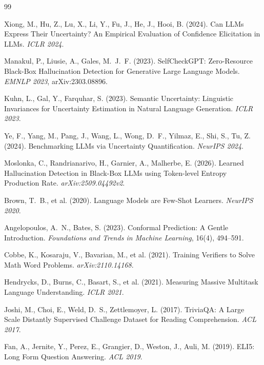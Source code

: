 \documentclass[12pt,a4paper]{article}
\begin{document}
\begin{thebibliography}{99}

Xiong, M., Hu, Z., Lu, X., Li, Y., Fu, J., He, J., Hooi, B. (2024).
Can LLMs Express Their Uncertainty? An Empirical Evaluation of
Confidence Elicitation in LLMs.
\textit{ICLR 2024}.

Manakul, P., Liusie, A., Gales, M.~J.~F. (2023).
SelfCheckGPT: Zero-Resource Black-Box Hallucination Detection for
Generative Large Language Models.
\textit{EMNLP 2023}, arXiv:2303.08896.

Kuhn, L., Gal, Y., Farquhar, S. (2023).
Semantic Uncertainty: Linguistic Invariances for Uncertainty
Estimation in Natural Language Generation.
\textit{ICLR 2023}.

Ye, F., Yang, M., Pang, J., Wang, L., Wong, D.~F., Yilmaz, E.,
Shi, S., Tu, Z. (2024).
Benchmarking LLMs via Uncertainty Quantification.
\textit{NeurIPS 2024}.

Moslonka, C., Randrianarivo, H., Garnier, A., Malherbe, E. (2026).
Learned Hallucination Detection in Black-Box LLMs using Token-level
Entropy Production Rate.
\textit{arXiv:2509.04492v2}.

Brown, T.~B., et al. (2020).
Language Models are Few-Shot Learners.
\textit{NeurIPS 2020}.

Angelopoulos, A.~N., Bates, S. (2023).
Conformal Prediction: A Gentle Introduction.
\textit{Foundations and Trends in Machine Learning}, 16(4), 494--591.

Cobbe, K., Kosaraju, V., Bavarian, M., et al. (2021).
Training Verifiers to Solve Math Word Problems.
\textit{arXiv:2110.14168}.

Hendrycks, D., Burns, C., Basart, S., et al. (2021).
Measuring Massive Multitask Language Understanding.
\textit{ICLR 2021}.

Joshi, M., Choi, E., Weld, D.~S., Zettlemoyer, L. (2017).
TriviaQA: A Large Scale Distantly Supervised Challenge Dataset for
Reading Comprehension.
\textit{ACL 2017}.

Fan, A., Jernite, Y., Perez, E., Grangier, D., Weston, J., Auli, M.
(2019).
ELI5: Long Form Question Answering.
\textit{ACL 2019}.

\end{thebibliography}
\end{document}
